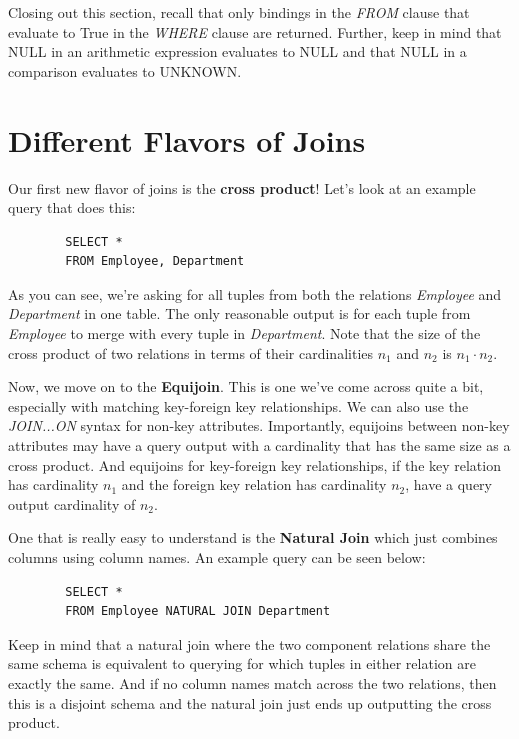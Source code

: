 \documentclass{article}
\begin{document}
Closing out this section, recall that only bindings in the \textit{FROM} clause that evaluate to True in the \textit{WHERE} clause are returned. Further, keep in mind that NULL in an arithmetic expression evaluates to NULL and that NULL in a comparison evaluates to UNKNOWN.

\section*{Different Flavors of Joins}

Our first new flavor of joins is the \textbf{cross product}! Let's look at an example query that does this:

\begin{tcolorbox}
    \begin{verbatim}
        SELECT *
        FROM Employee, Department
    \end{verbatim}
\end{tcolorbox}

As you can see, we're asking for all tuples from both the relations \textit{Employee} and \textit{Department} in one table. The only reasonable output is for each tuple from \textit{Employee} to merge with every tuple in \textit{Department}. Note that the size of the cross product of two relations in terms of their cardinalities $n_1$ and $n_2$ is $n_1 \cdot n_2$.

Now, we move on to the \textbf{Equijoin}. This is one we've come across quite a bit, especially with matching key-foreign key relationships. We can also use the \textit{JOIN...ON} syntax for non-key attributes. Importantly, equijoins between non-key attributes may have a query output with a cardinality that has the same size as a cross product. And equijoins for key-foreign key relationships, if the key relation has cardinality $n_1$ and the foreign key relation has cardinality $n_2$, have a query output cardinality of $n_2$.

One that is really easy to understand is the \textbf{Natural Join} which just combines columns using column names. An example query can be seen below:

\begin{tcolorbox}
    \begin{verbatim}
        SELECT *
        FROM Employee NATURAL JOIN Department
    \end{verbatim}
\end{tcolorbox}

Keep in mind that a natural join where the two component relations share the same schema is equivalent to querying for which tuples in either relation are exactly the same. And if no column names match across the two relations, then this is a disjoint schema and the natural join just ends up outputting the cross product.
\end{document}
